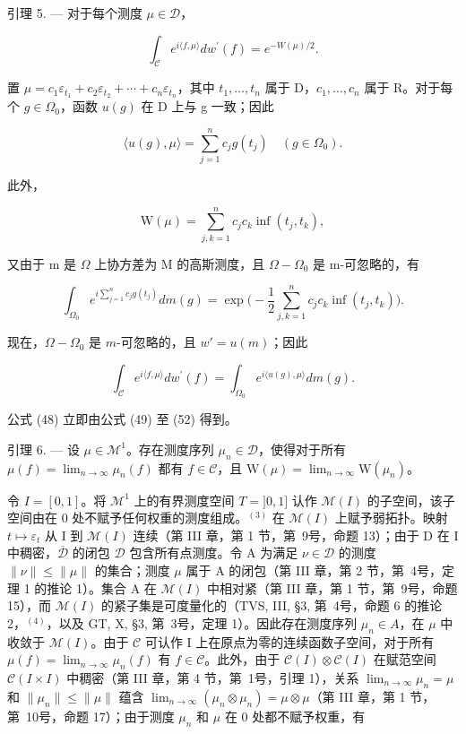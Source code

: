 引理 5. --- 对于每个测度 \(\mu \in \mathcal{D}\)，

\[
\int_ {\mathcal {C}} e ^ {i \langle f, \mu \rangle} d w ^ {\prime} (f) = e ^ {- W (\mu) / 2}.\tag{48}
\]

置 \(\mu=c_{1}\varepsilon_{t_{1}}+c_{2}\varepsilon_{t_{2}}+\cdots+c_{n}\varepsilon_{t_{n}}\)，其中 \(t_{1},\ldots,t_{n}\) 属于 D，\(c_{1},\ldots,c_{n}\) 属于 R。对于每个 \(g\in\Omega_{0}\)，函数 \(u(g)\) 在 D 上与 g 一致；因此

\[
\langle u (g), \mu \rangle = \sum_ {j = 1} ^ {n} c _ {j} g (t _ {j}) \quad (g \in \Omega_ {0}).\tag{49}
\]

此外，

\[
\mathrm{W} (\mu) = \sum_ {j, k = 1} ^ {n} c _ {j} c _ {k} \inf (t _ {j}, t _ {k}),\tag{50}
\]

又由于 m 是 \(\Omega\) 上协方差为 M 的高斯测度，且 \(\Omega - \Omega_{0}\) 是 m-可忽略的，有

\[
\int_ {\Omega_ {0}} e ^ {i \sum_ {j = 1} ^ {n} c _ {j} g (t _ {j})} d m (g) = \exp \Big (- \frac {1}{2} \sum_ {j, k = 1} ^ {n} c _ {j} c _ {k} \inf (t _ {j}, t _ {k}) \Big).\tag{51}
\]

现在，\(\Omega - \Omega_0\) 是 \(m\)-可忽略的，且 \(w' = u(m)\)；因此

\[
\int_ {\mathcal {C}} e ^ {i \langle f, \mu \rangle} d w ^ {\prime} (f) = \int_ {\Omega_ {0}} e ^ {i \langle u (g), \mu \rangle} d m (g).\tag{52}
\]

公式 (48) 立即由公式 (49) 至 (52) 得到。

引理 6. --- 设 \(\mu \in \mathcal{M}^1\)。存在测度序列 \(\mu_n \in \mathcal{D}\)，使得对于所有 \(\mu(f) = \lim_{n \to \infty} \mu_n(f)\) 都有 \(f \in \mathcal{C}\)，且 \(\mathrm{W}(\mu) = \lim_{n \to \infty} \mathrm{W}(\mu_n)\)。

令 \(I = [0,1]\)。将 \(\mathcal{M}^1\) 上的有界测度空间 \(T = ]0,1]\) 认作 \(\mathcal{M}(I)\) 的子空间，该子空间由在 0 处不赋予任何权重的测度组成。\(^{(3)}\) 在 \(\mathcal{M}(I)\) 上赋予弱拓扑。映射 \(t \mapsto \varepsilon_t\) 从 I 到 \(\mathcal{M}(I)\) 连续（第 III 章，第 1 节，第~9号，命题 13）；由于 D 在 I 中稠密，\(\overline{\mathcal{D}}\) 的闭包 \(\mathcal{D}\) 包含所有点测度。令 A 为满足 \(\nu \in \mathcal{D}\) 的测度 \(\| \nu \| \leqslant \| \mu \|\) 的集合；测度 \(\mu\) 属于 A 的闭包（第 III 章，第 2 节，第~4号，定理 1 的推论 1）。集合 A 在 \(\mathcal{M}(I)\) 中相对紧（第 III 章，第 1 节，第~9号，命题 15），而 \(\mathcal{M}(I)\) 的紧子集是可度量化的（TVS, III, §3, 第~4号，命题 6 的推论 2，\(^{(4)}\)，以及 GT, X, §3, 第~3号，定理 1）。因此存在测度序列 \(\mu_n \in A\)，在 \(\mu\) 中收敛于 \(\mathcal{M}(I)\)。由于 \(\mathcal{C}\) 可认作 I 上在原点为零的连续函数子空间，对于所有 \(\mu(f) = \lim_{n \to \infty} \mu_n(f)\) 有 \(f \in \mathcal{C}\)。此外，由于 \(\mathcal{C}(I) \otimes \mathcal{C}(I)\) 在赋范空间 \(\mathcal{C}(I \times I)\) 中稠密（第 III 章，第 4 节，第~1号，引理 1），关系 \(\lim_{n \to \infty} \mu_n = \mu\) 和 \(\| \mu_n \| \leqslant \| \mu \|\) 蕴含 \(\lim_{n \to \infty} (\mu_n \otimes \mu_n) = \mu \otimes \mu\)（第 III 章，第 1 节，第~10号，命题 17）；由于测度 \(\mu_n\) 和 \(\mu\) 在 0 处都不赋予权重，有

